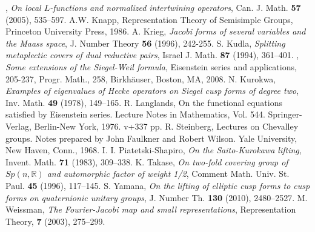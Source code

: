 \documentclass[11pt]{amsart}
\numberwithin{equation}{section}
\theoremstyle{definition}
\begin{document}
\begin{thebibliography}{99}
 \bysame, {\em On local $L$-functions and normalized intertwining operators}, Can. J. Math. {\bf 57} (2005), 535--597. 
 A.W. Knapp, Representation Theory of Semisimple Groups, Princeton University Press, 1986.
 A. Krieg, {\em Jacobi forms of several variables and the Maass space}, J. Number Theory {\bf 56} (1996), 242-255.
 S. Kudla, {\em Splitting metaplectic covers of dual reductive pairs}, Israel J. Math. {\bf 87} (1994), 361--401.
 \bysame, {\em Some extensions of the Siegel-Weil formula}, Eisenstein series and applications, 205-237, Progr. Math., 258, Birkh\"auser, Boston, MA, 2008.
 N. Kurokwa, {\em Examples of eigenvalues of Hecke operators on Siegel cusp forms of degree two}, Inv. Math. {\bf 49} (1978), 149--165.
R. Langlands, On the functional equations satisfied by Eisenstein series. Lecture Notes in Mathematics, Vol. 544. Springer-Verlag, Berlin-New York, 1976. v+337 pp.
 R. Steinberg, Lectures on Chevalley groups. Notes prepared by John Faulkner and Robert Wilson. Yale University, New Haven, Conn., 1968.
I. I. Piatetski-Shapiro, {\em On the Saito-Kurokawa lifting}, Invent. Math. {\bf 71} (1983), 309--338. 
 K. Takase, {\em On two-fold covering group of $Sp(n,{\mathbb{R}})$ and automorphic factor of weight 1/2},
Comment Math. Univ. St. Paul. {\bf 45} (1996), 117--145. 
 S. Yamana, {\em On the lifting of elliptic cusp forms to cusp forms on quaternionic unitary groups},  
J. Number Th. {\bf 130} (2010), 2480--2527.
 M. Weissman, {\em The Fourier-Jacobi map and small representations}, Representation Theory, {\bf 7} (2003), 275--299.
\end{thebibliography}
\end{document}
